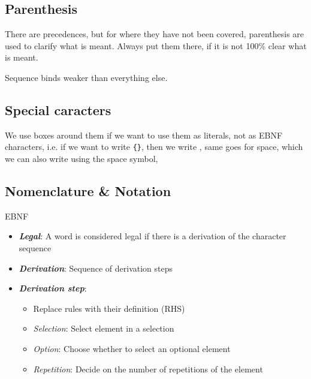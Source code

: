 \subsection{Parenthesis}
There are precedences, but for where they have not been covered, parenthesis are used to clarify what is meant. Always put them there, if it is not 100\% clear what is meant.

Sequence binds weaker than everything else.


\subsection{Special caracters}
We use boxes around them if we want to use them as literals, not as EBNF characters, i.e. if we want to write \texttt{\{\}}, then we write \fbox{\{\}}, same goes for space, which we can also write using the space symbol, \begin{Large}\textvisiblespace\end{Large}

\newpage
\subsection{Nomenclature \& Notation}
\begin{terms}[]{EBNF}
    \begin{itemize}
        \item \textbf{\textit{Legal}}: A word is considered legal if there is a derivation of the character sequence
        \item \textbf{\textit{Derivation}}: Sequence of derivation steps
        \item \textbf{\textit{Derivation step}}: 
            \begin{itemize}
                \item Replace rules with their definition (RHS)
                \item \textit{Selection}: Select element in a selection
                \item \textit{Option}: Choose whether to select an optional element
                \item \textit{Repetition}: Decide on the number of repetitions of the element
            \end{itemize}
    \end{itemize}
\end{terms}


